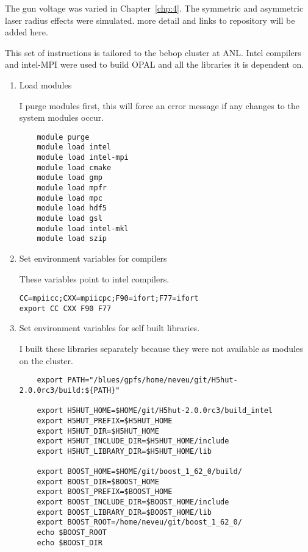\documentclass[table]{iitthesis}
\newcommand{\nrnote}[1]{\textsf{{\color{blue}{ NN note:}   #1 }}}
\begin{document}
\label{gunsims}
The gun voltage was varied in Chapter~\ref{chp:4}. 
The symmetric and asymmetric laser radius effects were simulated.
 \nrnote{more detail and links to repository will be added here.}

 \label{build}
This set of instructions is tailored to the bebop cluster at ANL. 
Intel compilers and intel-MPI were used to build OPAL and all 
the libraries it is dependent on.
\begin{enumerate}[label=Step \arabic*:]
	\item Load modules 

I purge modules first, this will force an error message if any changes
to the system modules occur.
\begin{lstlisting}
	module purge
	module load intel
	module load intel-mpi 
	module load cmake 
	module load gmp   
	module load mpfr  
	module load mpc   
	module load hdf5   
	module load gsl   
	module load intel-mkl
	module load szip
\end{lstlisting}

    \item Set environment variables for compilers 
 
These variables point to intel compilers. 
\begin{lstlisting}
CC=mpiicc;CXX=mpiicpc;F90=ifort;F77=ifort
export CC CXX F90 F77
\end{lstlisting}

    \item Set environment variables for self built libraries.
    
I built these libraries separately because they were not available as 
modules on the cluster. 

\begin{lstlisting}
	export PATH="/blues/gpfs/home/neveu/git/H5hut-2.0.0rc3/build:${PATH}"
	
	export H5HUT_HOME=$HOME/git/H5hut-2.0.0rc3/build_intel
	export H5HUT_PREFIX=$H5HUT_HOME
	export H5HUT_DIR=$H5HUT_HOME
	export H5HUT_INCLUDE_DIR=$H5HUT_HOME/include
	export H5HUT_LIBRARY_DIR=$H5HUT_HOME/lib
	
	export BOOST_HOME=$HOME/git/boost_1_62_0/build/
	export BOOST_DIR=$BOOST_HOME
	export BOOST_PREFIX=$BOOST_HOME
	export BOOST_INCLUDE_DIR=$BOOST_HOME/include
	export BOOST_LIBRARY_DIR=$BOOST_HOME/lib
	export BOOST_ROOT=/home/neveu/git/boost_1_62_0/
	echo $BOOST_ROOT
	echo $BOOST_DIR
\end{lstlisting}


\end{enumerate}
\end{document}
